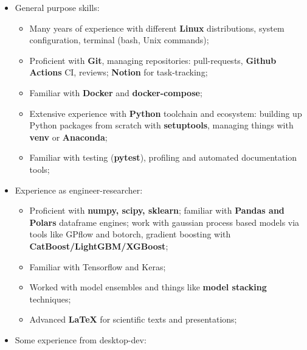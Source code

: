 \documentclass[12pt,a4paper,sans]{moderncv}
\begin{document}
 \begin{itemize}
 \item General purpose skills: \newline
    \begin{itemize}
        \item Many years of experience with different \textbf{Linux} distributions, system configuration, terminal (bash, Unix commands); \newline
        \item Proficient with \textbf{Git}, managing repositories: pull-requests,  \textbf{Github Actions} CI, reviews; \textbf{Notion} for task-tracking; \newline
        \item Familiar with \textbf{Docker} and \textbf{docker-compose}; \newline
        \item Extensive experience with \textbf{Python} toolchain and ecosystem: building up Python packages from scratch with \textbf{setuptools},
managing things with \textbf{venv} or \textbf{Anaconda}; \newline
        \item Familiar with testing (\textbf{pytest}), profiling and automated documentation tools; \newline
    \end{itemize}    
 \item Experience as engineer-researcher:\newline
    \begin{itemize}
        \item Proficient with \textbf{numpy, scipy, sklearn}; familiar with \textbf{Pandas and Polars} dataframe engines;
         work with gaussian process based models via tools like GPflow and botorch, 
        gradient boosting with \textbf{CatBoost/LightGBM/XGBoost}; 
        \item Familiar with Tensorflow and Keras; \newline
        \item Worked with model ensembles and things like \textbf{model stacking} techniques; \newline
        \item Advanced \textbf{LaTeX} for scientific texts and presentations; \newline
    \end{itemize} 
 \item Some experience from desktop-dev:\newline
    \begin{itemize}

\end{itemize}
\end{itemize}
\end{document}
